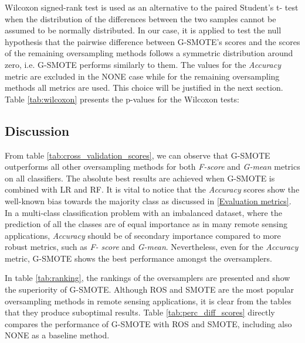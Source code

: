 \documentclass[remotesensing,article,submit,moreauthors,pdftex]{Definitions/mdpi}
\begin{document}
Wilcoxon signed-rank test is used as an alternative to the paired Student's t-
test when the distribution of the differences between the two samples cannot be
assumed to be normally distributed. In our case, it is applied to test the null
hypothesis that the pairwise difference between G-SMOTE's scores and the scores
of the remaining oversampling methods follows a symmetric distribution around
zero, i.e. G-SMOTE performs similarly to them. The values for the
\textit{Accuracy} metric are excluded in the NONE case while for the remaining
oversampling methods all metrics are used. This choice will be justified in the
next section. Table \ref{tab:wilcoxon} presents the p-values for the Wilcoxon
tests:


\subsection{Discussion}

From table \ref{tab:cross_validation_scores}, we can observe that G-SMOTE
outperforms all other oversampling methods for both \textit{F-score} and
\textit{G-mean} metrics on all classifiers. The absolute best results are
achieved when G-SMOTE is combined with LR and RF. It is vital to notice that the
\textit{Accuracy} scores show the well-known bias towards the majority class as
discussed in \ref{Evaluation metrics}. In a multi-class classification problem
with an imbalanced dataset, where the prediction of all the classes are of equal
importance as in many remote sensing applications, \textit{Accuracy} should be
of secondary importance compared to more robust metrics, such as \textit{F-
score} and \textit{G-mean}. Nevertheless, even for the \textit{Accuracy} metric,
G-SMOTE shows the best performance amongst the oversamplers.

In table \ref{tab:ranking}, the rankings of the oversamplers are presented
and show the superiority of G-SMOTE. Although ROS and SMOTE are the most popular
oversampling methods in remote sensing applications, it is clear from the tables
that they produce suboptimal results. Table \ref{tab:perc_diff_scores} directly
compares the performance of G-SMOTE with ROS and SMOTE, including also NONE as a
baseline method.
\end{document}
